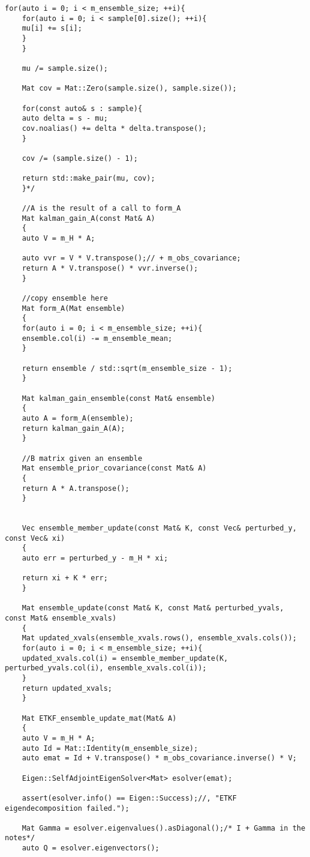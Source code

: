 \documentclass[11pt]{article}
\begin{document}
\begin{Verbatim}[xleftmargin=-2cm]
	for(auto i = 0; i < m_ensemble_size; ++i){
	for(auto i = 0; i < sample[0].size(); ++i){
	mu[i] += s[i];
	}
	}
	
	mu /= sample.size();
	
	Mat cov = Mat::Zero(sample.size(), sample.size());
	
	for(const auto& s : sample){
	auto delta = s - mu;
	cov.noalias() += delta * delta.transpose();
	}
	
	cov /= (sample.size() - 1);
	
	return std::make_pair(mu, cov);
	}*/
	
	//A is the result of a call to form_A
	Mat kalman_gain_A(const Mat& A)
	{
	auto V = m_H * A;
	
	auto vvr = V * V.transpose();// + m_obs_covariance;
	return A * V.transpose() * vvr.inverse();
	}   
	
	//copy ensemble here 
	Mat form_A(Mat ensemble)
	{
	for(auto i = 0; i < m_ensemble_size; ++i){
	ensemble.col(i) -= m_ensemble_mean;
	}
	
	return ensemble / std::sqrt(m_ensemble_size - 1);
	}
	
	Mat kalman_gain_ensemble(const Mat& ensemble)
	{
	auto A = form_A(ensemble);
	return kalman_gain_A(A);
	}
	
	//B matrix given an ensemble
	Mat ensemble_prior_covariance(const Mat& A)
	{
	return A * A.transpose();
	}
	
	
	Vec ensemble_member_update(const Mat& K, const Vec& perturbed_y, const Vec& xi)
	{
	auto err = perturbed_y - m_H * xi;
	
	return xi + K * err;
	}
	
	Mat ensemble_update(const Mat& K, const Mat& perturbed_yvals, const Mat& ensemble_xvals)
	{
	Mat updated_xvals(ensemble_xvals.rows(), ensemble_xvals.cols());
	for(auto i = 0; i < m_ensemble_size; ++i){
	updated_xvals.col(i) = ensemble_member_update(K, perturbed_yvals.col(i), ensemble_xvals.col(i));
	}
	return updated_xvals;
	}
	
	Mat ETKF_ensemble_update_mat(Mat& A)
	{
	auto V = m_H * A;
	auto Id = Mat::Identity(m_ensemble_size);
	auto emat = Id + V.transpose() * m_obs_covariance.inverse() * V;
	
	Eigen::SelfAdjointEigenSolver<Mat> esolver(emat);
	
	assert(esolver.info() == Eigen::Success);//, "ETKF eigendecomposition failed.");
	
	Mat Gamma = esolver.eigenvalues().asDiagonal();/* I + Gamma in the notes*/
	auto Q = esolver.eigenvectors();
	

\end{Verbatim}
\end{document}
